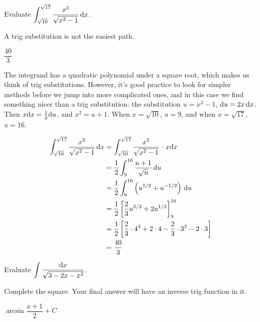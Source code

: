 \begin{question}
Evaluate $\displaystyle\int_{\sqrt{10}}^{\sqrt{17}} \frac{x^3}{\sqrt{x^2-1}}\, \mathrm{d}x$.
\end{question}
\begin{hint}
A trig substitution is not the easiest path.
\end{hint}
\begin{answer}
$\dfrac{40}{3}$
\end{answer}
\begin{solution}
The integrand has a quadratic polynomial under a square root, which makes us think of trig substitutions. However, it's good practice to look for simpler methods before we jump into more complicated ones, and in this case we find something nicer than a trig substitution: the substitution $u=x^2-1$, $\mathrm{d}u=2x\,\mathrm{d}x$. Then $x\mathrm{d}x = \frac{1}{2}\mathrm{d}u$, and $x^2 ={u+1}$. When $x=\sqrt{10}$, $u=9$, and when $x=\sqrt{17}$, $u=16$.

\begin{align*}
\int_{\sqrt{10}}^{\sqrt{17}} \frac{x^3}{\sqrt{x^2-1}}\, \mathrm{d}x&=
\int_{\sqrt{10}}^{\sqrt{17}} \frac{x^2}{\sqrt{x^2-1}}\, \cdot x\mathrm{d}x
\\&=\frac{1}{2}
\int_{9}^{16} \frac{u+1}{\sqrt{u}}\,\mathrm{d}u\\
&=\frac{1}{2}
\int_{9}^{16}\left(u^{1/2}+u^{-1/2}\right)\,\mathrm{d}u
\\&=\frac{1}{2}\left[\frac{2}{3}u^{3/2} + 2u^{1/2}
\right]_{9}^{16}
\\&=\frac{1}{2}\left[\frac{2}{3}\cdot 4^3 + 2\cdot 4
-\frac{2}{3}\cdot 3^3 -2\cdot 3
\right]\\
&=\frac{40}{3}
\end{align*}
\end{solution}

\begin{Mquestion}[M105 2014A]
Evaluate $\displaystyle\int \frac{\mathrm{d}x}{\sqrt{3-2x-x^2}}$.
\end{Mquestion}

\begin{hint} 
Complete the square. Your final answer will have an inverse trig function in it.
\end{hint}

\begin{answer} 
$\arcsin\dfrac{x+1}{2} + C$
\end{answer}

